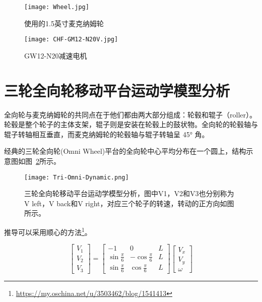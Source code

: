\begin{figure}
    \begin{minipage}{0.48\textwidth}
      \centering
      \texttt{[image: Wheel.jpg]}
      \caption{使用的1.5英寸麦克纳姆轮}
      \label{fig:Wheel}
    \end{minipage}\hfill
    \begin{minipage}{0.48\textwidth}
      \centering
      \texttt{[image: CHF-GM12-N20V.jpg]}
      \caption{GW12-N20减速电机}
      \label{fig:GM12}
    \end{minipage}
\end{figure}

\section{三轮全向轮移动平台运动学模型分析}

全向轮与麦克纳姆轮的共同点在于他们都由两大部分组成：轮毂和辊子（roller）。轮毂是整个轮子的主体支架，辊子则是安装在轮毂上的鼓状物。全向轮的轮毂轴与辊子转轴相互垂直，而麦克纳姆轮的轮毂轴与辊子转轴呈 45° 角。

经典的三轮全向轮(Omni Wheel)平台的全向轮中心平均分布在一个圆上，结构示意图如图~\ref{fig:Tri-Omni-Dynamic}所示。

\begin{figure}[htbp]
    \centering
    \texttt{[image: Tri-Omni-Dynamic.png]}
    \caption{三轮全向轮移动平台运动学模型分析，图中V1，V2和V3也分别称为V left，V back和V right，对应三个轮子的转速，转动的正方向如图所示。}
    \label{fig:Tri-Omni-Dynamic}
\end{figure}

推导可以采用顺心的方法\footnote{\url{https://my.oschina.net/u/3503462/blog/1541413}}。

\begin{equation}
    \left[\begin{array}{l}
    {V_{1}} \\
    {V_{2}} \\
    {V_{3}}
    \end{array}\right]=\left[\begin{array}{ccc}
    {-1} & {0} & {L} \\
    {\sin \frac{\pi}{6}} & {-\cos \frac{\pi}{6}} & {L} \\
    {\sin \frac{\pi}{6}} & {\cos \frac{\pi}{6}} & {L}
    \end{array}\right]\left[\begin{array}{l}
    {V_{x}} \\
    {V_{y}} \\
    {\omega}
    \end{array}\right]
\end{equation}

